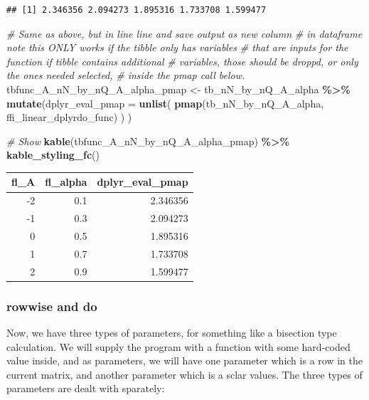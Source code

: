 \documentclass[
]{book}
\newenvironment{Shaded}{\begin{snugshade}}{\end{snugshade}}
\newcommand{\CommentTok}[1]{\textcolor[rgb]{0.56,0.35,0.01}{\textit{#1}}}
\newcommand{\DataTypeTok}[1]{\textcolor[rgb]{0.13,0.29,0.53}{#1}}
\newcommand{\KeywordTok}[1]{\textcolor[rgb]{0.13,0.29,0.53}{\textbf{#1}}}
\newcommand{\NormalTok}[1]{#1}
\newcommand{\OperatorTok}[1]{\textcolor[rgb]{0.81,0.36,0.00}{\textbf{#1}}}
\newcommand{\StringTok}[1]{\textcolor[rgb]{0.31,0.60,0.02}{#1}}
\begin{document}
\begin{verbatim}
## [1] 2.346356 2.094273 1.895316 1.733708 1.599477
\end{verbatim}

\begin{Shaded}
\begin{Highlighting}[]
\CommentTok{\# Same as above, but in line line and save output as new column}
\CommentTok{\# in dataframe note this ONLY works if the tibble only has variables}
\CommentTok{\# that are inputs for the function if tibble contains additional}
\CommentTok{\#  variables, those should be droppd, or only the ones needed selected,}
\CommentTok{\# inside the pmap call below.}
\NormalTok{tbfunc\_A\_nN\_by\_nQ\_A\_alpha\_pmap \textless{}{-}}\StringTok{ }\NormalTok{tb\_nN\_by\_nQ\_A\_alpha }\OperatorTok{\%\textgreater{}\%}
\StringTok{  }\KeywordTok{mutate}\NormalTok{(}\DataTypeTok{dplyr\_eval\_pmap =}
           \KeywordTok{unlist}\NormalTok{(}
             \KeywordTok{pmap}\NormalTok{(tb\_nN\_by\_nQ\_A\_alpha, ffi\_linear\_dplyrdo\_func)}
\NormalTok{           )}
\NormalTok{  )}

\CommentTok{\# Show}
\KeywordTok{kable}\NormalTok{(tbfunc\_A\_nN\_by\_nQ\_A\_alpha\_pmap) }\OperatorTok{\%\textgreater{}\%}
\StringTok{  }\KeywordTok{kable\_styling\_fc}\NormalTok{()}
\end{Highlighting}
\end{Shaded}

\begin{table}[!h]
\centering
\begin{tabular}{r|r|r}
\hline
fl\_A & fl\_alpha & dplyr\_eval\_pmap\\
\hline
\rowcolor{gray!6}  -2 & 0.1 & 2.346356\\
\hline
-1 & 0.3 & 2.094273\\
\hline
\rowcolor{gray!6}  0 & 0.5 & 1.895316\\
\hline
1 & 0.7 & 1.733708\\
\hline
\rowcolor{gray!6}  2 & 0.9 & 1.599477\\
\hline
\end{tabular}
\end{table}

\hypertarget{rowwise-and-do}{%
\subsubsection{rowwise and do}\label{rowwise-and-do}}

Now, we have three types of parameters, for something like a bisection type calculation. We will supply the program with a function with some hard-coded value inside, and as parameters, we will have one parameter which is a row in the current matrix, and another parameter which is a sclar values. The three types of parameters are dealt with sparately:
\end{document}
